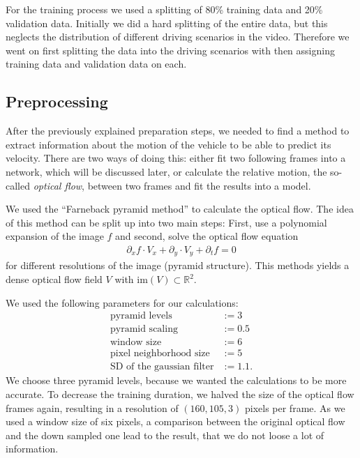 \documentclass[conference]{IEEEtran}
\begin{document}
For the training process we used a splitting of 80\% training data and 20\% validation data. Initially 
we did a hard splitting of the entire data, but this neglects the distribution of different driving 
scenarios in the video. Therefore we went on first splitting the data into the driving scenarios with 
then assigning training data and validation data on each.

\subsection{Preprocessing}

After the previously explained preparation steps, we needed to find a method to extract information 
about the motion of the vehicle to be able to predict its velocity. There are two ways of doing this: 
either fit two following frames into a network, which will be discussed later, or calculate the relative 
motion, the so-called \emph{optical flow}, between two frames and fit the results into a model.

We used the \enquote{Farneback pyramid method} \cite{Farneback2003} to calculate the optical flow.
The idea of this method can be split up into two main steps: First, use a polynomial expansion of the 
image $f$ and second, solve the optical flow equation
\begin{align*}
\partial_x f \cdot V_x + \partial_y \cdot V_y + \partial_t f = 0
\end{align*}
for different resolutions of the image (pyramid structure). This methods yields a dense optical flow 
field $V$ with $\mathrm{im}(V) \subset \mathbb{R}^2$.

We used the following parameters for our calculations:
\begin{align*}
\text{pyramid levels} &:= 3\\
\text{pyramid scaling} &:= 0.5\\
\text{window size} &:= 6\\
\text{pixel neighborhood size} &:= 5\\
\text{SD of the gaussian filter} &:= 1.1.
\end{align*}
We choose three pyramid levels, because we wanted the calculations to be more accurate. To decrease the 
training duration, we halved the size of the optical flow frames again, resulting in a resolution of
$(160,105,3)$ pixels per frame. As we used a window size of six pixels, a comparison between the 
original optical flow and the down sampled one lead to the result, that we do not loose a lot of 
information.
\end{document}
